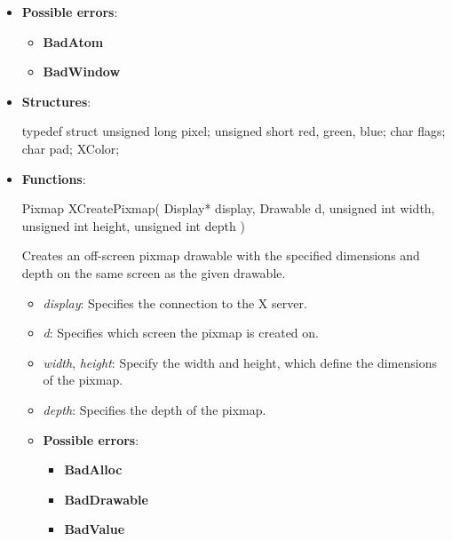 \documentclass{report}
\begin{document}
\begin{itemize}
            \begin{itemize}
                \item \textbf{Possible errors}:
                    \begin{itemize}
                        \item \textbf{BadAtom}
                        \item \textbf{BadWindow}
                    \end{itemize}
            \end{itemize}


    \end{itemize}

    \pagebreak 
    \begin{itemize}
        \item \textbf{Structures}:
            \begin{cppcode}
                typedef struct {
                    unsigned long pixel;
                    unsigned short red, green, blue;
                    char flags; 
                    char pad;
                } XColor;
            \end{cppcode}
        \item \textbf{Functions}:
            \begin{cppcode}
                Pixmap XCreatePixmap(
                    Display* display,
                    Drawable d,
                    unsigned int width,
                    unsigned int height,
                    unsigned int depth
                )
            \end{cppcode}
            \bigbreak \noindent
            Creates an off-screen pixmap drawable with the specified dimensions and depth on the same screen as the given drawable.

            \begin{itemize}
                \item \textit{display}: Specifies the connection to the X server.
                \item \textit{d}: Specifies which screen the pixmap is created on.
                \item \textit{width}, \textit{height}: Specify the width and height, which define the dimensions of the pixmap.
                \item \textit{depth}: Specifies the depth of the pixmap.
            \end{itemize}

            \begin{itemize}
                \item \textbf{Possible errors}:
                    \begin{itemize}
                        \item \textbf{BadAlloc}
                        \item \textbf{BadDrawable}
                        \item \textbf{BadValue}
                    \end{itemize}
            \end{itemize}


\end{itemize}
\end{document}
